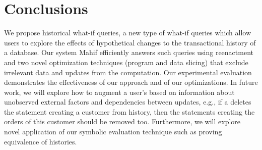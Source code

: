 \section{Conclusions}
\label{sec:conclusions}

We propose historical what-if queries, a new type of what-if queries which allow users to explore the effects of hypothetical changes to the transactional history of a database. Our system Mahif efficiently answers such queries using reenactment %
and  two novel optimization  techniques (program and data slicing) that exclude irrelevant data and updates from the computation.
% 
% 
% 
% 
Our experimental evaluation demonstrates the effectiveness of our approach and of our optimizations.
%
In future work, we will explore how to augment a user's \abbrHW based on information about unobserved external factors and dependencies between updates, e.g., if a \abbrHW deletes the statement creating a customer from history, then the statements creating the orders of this customer should be removed too. Furthermore, we will explore novel application of our symbolic evaluation technique such as proving equivalence of histories.

%

%
%
%

%
%
%
%


